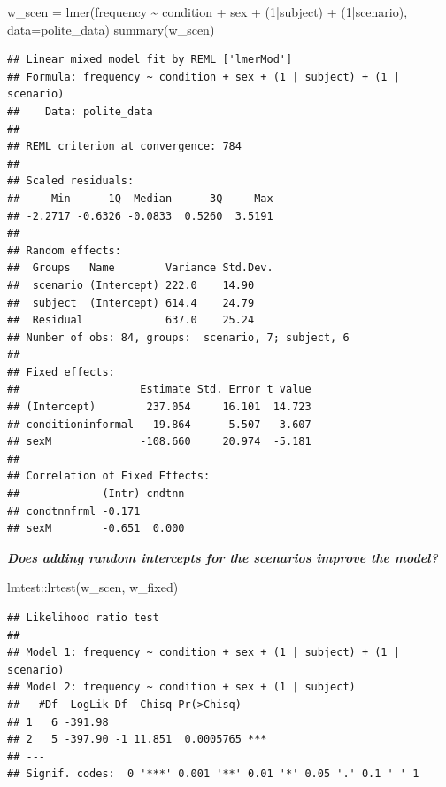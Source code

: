 \documentclass[
  openany]{book}
\newenvironment{Shaded}{\begin{snugshade}}{\end{snugshade}}
\newcommand{\AttributeTok}[1]{\textcolor[rgb]{0.77,0.63,0.00}{#1}}
\newcommand{\DecValTok}[1]{\textcolor[rgb]{0.00,0.00,0.81}{#1}}
\newcommand{\FunctionTok}[1]{\textcolor[rgb]{0.00,0.00,0.00}{#1}}
\newcommand{\NormalTok}[1]{#1}
\newcommand{\OtherTok}[1]{\textcolor[rgb]{0.56,0.35,0.01}{#1}}
\newcommand{\SpecialCharTok}[1]{\textcolor[rgb]{0.00,0.00,0.00}{#1}}
\begin{document}
\begin{Shaded}
\begin{Highlighting}[]
\NormalTok{w\_scen }\OtherTok{=} \FunctionTok{lmer}\NormalTok{(frequency }\SpecialCharTok{\textasciitilde{}}\NormalTok{ condition }\SpecialCharTok{+}\NormalTok{ sex }\SpecialCharTok{+}\NormalTok{ (}\DecValTok{1}\SpecialCharTok{|}\NormalTok{subject) }\SpecialCharTok{+}\NormalTok{ (}\DecValTok{1}\SpecialCharTok{|}\NormalTok{scenario), }\AttributeTok{data=}\NormalTok{polite\_data)}
\FunctionTok{summary}\NormalTok{(w\_scen)}
\end{Highlighting}
\end{Shaded}

\begin{verbatim}
## Linear mixed model fit by REML ['lmerMod']
## Formula: frequency ~ condition + sex + (1 | subject) + (1 | scenario)
##    Data: polite_data
## 
## REML criterion at convergence: 784
## 
## Scaled residuals: 
##     Min      1Q  Median      3Q     Max 
## -2.2717 -0.6326 -0.0833  0.5260  3.5191 
## 
## Random effects:
##  Groups   Name        Variance Std.Dev.
##  scenario (Intercept) 222.0    14.90   
##  subject  (Intercept) 614.4    24.79   
##  Residual             637.0    25.24   
## Number of obs: 84, groups:  scenario, 7; subject, 6
## 
## Fixed effects:
##                   Estimate Std. Error t value
## (Intercept)        237.054     16.101  14.723
## conditioninformal   19.864      5.507   3.607
## sexM              -108.660     20.974  -5.181
## 
## Correlation of Fixed Effects:
##             (Intr) cndtnn
## condtnnfrml -0.171       
## sexM        -0.651  0.000
\end{verbatim}

\textbf{\emph{Does adding random intercepts for the scenarios improve the model?}}

\begin{Shaded}
\begin{Highlighting}[]
\NormalTok{lmtest}\SpecialCharTok{::}\FunctionTok{lrtest}\NormalTok{(w\_scen, w\_fixed)}
\end{Highlighting}
\end{Shaded}

\begin{verbatim}
## Likelihood ratio test
## 
## Model 1: frequency ~ condition + sex + (1 | subject) + (1 | scenario)
## Model 2: frequency ~ condition + sex + (1 | subject)
##   #Df  LogLik Df  Chisq Pr(>Chisq)    
## 1   6 -391.98                         
## 2   5 -397.90 -1 11.851  0.0005765 ***
## ---
## Signif. codes:  0 '***' 0.001 '**' 0.01 '*' 0.05 '.' 0.1 ' ' 1
\end{verbatim}
\end{document}
